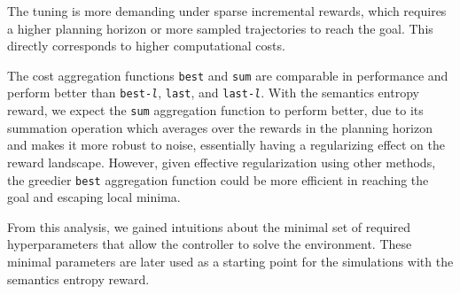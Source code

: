 The tuning is more demanding under sparse incremental rewards, which requires a higher planning horizon or more sampled trajectories to reach the goal.
This directly corresponds to higher computational costs.

The cost aggregation functions \texttt{best} and \texttt{sum} are comparable in performance and perform better than \texttt{best-\emph{l}}, \texttt{last}, and \texttt{last-\emph{l}}.
With the semantics entropy reward, we expect the \texttt{sum} aggregation function to perform better, due to its summation operation which averages over the rewards in the planning horizon and makes it more robust to noise, essentially having a regularizing effect on the reward landscape.
However, given effective regularization using other methods, the greedier \texttt{best} aggregation function could be more efficient in reaching the goal and escaping local minima.

From this analysis, we gained intuitions about the minimal set of required hyperparameters that allow the controller to solve the environment.
These minimal parameters are later used as a starting point for the simulations with the semantics entropy reward.









